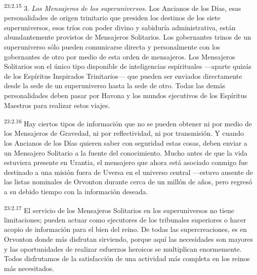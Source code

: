 \par
\textsuperscript{23:2.15} 3. \textit{Los Mensajeros de los superuniversos.} Los Ancianos de los Días, esas personalidades de origen trinitario que presiden los destinos de los siete superuniversos, esos tríos con poder divino y sabiduría administrativa, están abundantemente provistos de Mensajeros Solitarios. Los gobernantes trinos de un superuniverso sólo pueden comunicarse directa y personalmente con los gobernantes de otro por medio de esta orden de mensajeros. Los Mensajeros Solitarios son el único tipo disponible de inteligencias espirituales ---aparte quizás de los Espíritus Inspirados Trinitarios--- que pueden ser enviados directamente desde la sede de un superuniverso hasta la sede de otro. Todas las demás personalidades deben pasar por Havona y los mundos ejecutivos de los Espíritus Maestros para realizar estos viajes.

\par
\textsuperscript{23:2.16} Hay ciertos tipos de información que no se pueden obtener ni por medio de los Mensajeros de Gravedad, ni por reflectividad, ni por transmisión. Y cuando los Ancianos de los Días quieren saber con seguridad estas cosas, deben enviar a un Mensajero Solitario a la fuente del conocimiento. Mucho antes de que la vida estuviera presente en Urantia, el mensajero que ahora está asociado conmigo fue destinado a una misión fuera de Uversa en el universo central ---estuvo ausente de las listas nominales de Orvonton durante cerca de un millón de años, pero regresó a su debido tiempo con la información deseada.

\par
\textsuperscript{23:2.17} El servicio de los Mensajeros Solitarios en los superuniversos no tiene limitaciones; pueden actuar como ejecutores de los tribunales superiores o hacer acopio de información para el bien del reino. De todas las supercreaciones, es en Orvonton donde más disfrutan sirviendo, porque aquí las necesidades son mayores y las oportunidades de realizar esfuerzos heroicos se multiplican enormemente. Todos disfrutamos de la satisfacción de una actividad más completa en los reinos más necesitados.

